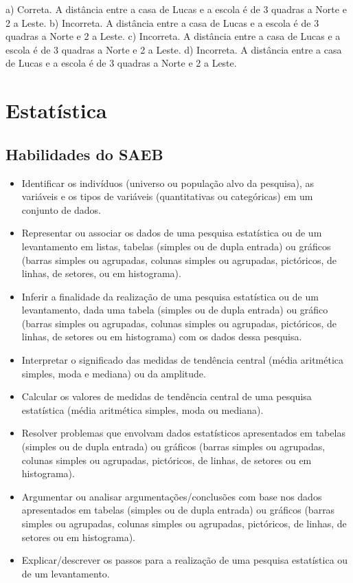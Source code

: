 \begin{escolha}
\begin{escolha}
\begin{escolha}
\begin{escolha}
{\begin{boxmedio}
\begin{boxpeq}
\begin{q°}
\begin{boxmedio}
\begin{boxpeq}
\begin{boxpeq}
\begin{boxmedio}
\begin{boxmedio}
\begin{boxmedio}
{a) Correta. A distância entre a casa de Lucas e a escola é de 3 quadras a Norte e 2 a 
Leste.
b) Incorreta. A distância entre a casa de Lucas e a escola é de 3 quadras a Norte e 2 a 
Leste.
c) Incorreta. A distância entre a casa de Lucas e a escola é de 3 quadras a Norte e 2 a 
Leste.
d) Incorreta. A distância entre a casa de Lucas e a escola é de 3 quadras a Norte e 2 a 
Leste.}

\chapter{Estatística}

\section{Habilidades do SAEB}

\begin{itemize}

  \item Identificar os indivíduos (universo ou população alvo da pesquisa), as
variáveis e os tipos de variáveis (quantitativas ou categóricas) em um
conjunto de dados.
  \item Representar ou associar os dados de uma pesquisa estatística ou de um
levantamento em listas, tabelas (simples ou de dupla entrada) ou gráficos
(barras simples ou agrupadas, colunas simples ou agrupadas, pictóricos,
de linhas, de setores, ou em histograma).
  \item Inferir a finalidade da realização de uma pesquisa estatística ou de um
levantamento, dada uma tabela (simples ou de dupla entrada) ou gráfico
(barras simples ou agrupadas, colunas simples ou agrupadas, pictóricos,
de linhas, de setores ou em histograma) com os dados dessa pesquisa. 
  \item Interpretar o significado das medidas de tendência central (média
aritmética simples, moda e mediana) ou da amplitude. 
  \item Calcular os valores de medidas de tendência central de uma pesquisa
estatística (média aritmética simples, moda ou mediana). 
  \item Resolver problemas que envolvam dados estatísticos apresentados em
tabelas (simples ou de dupla entrada) ou gráficos (barras simples ou
agrupadas, colunas simples ou agrupadas, pictóricos, de linhas, de setores
ou em histograma). 
  \item Argumentar ou analisar argumentações/conclusões com base nos dados
apresentados em tabelas (simples ou de dupla entrada) ou gráficos (barras
simples ou agrupadas, colunas simples ou agrupadas, pictóricos, de linhas,
de setores ou em histograma). 
  \item Explicar/descrever os passos para a realização de uma pesquisa
estatística ou de um levantamento.


\end{itemize}
\end{boxmedio}
\end{boxmedio}
\end{boxmedio}
\end{boxpeq}
\end{boxpeq}
\end{boxmedio}
\end{q°}
\end{boxpeq}
\end{boxmedio}}
\end{escolha}
\end{escolha}
\end{escolha}
\end{escolha}
